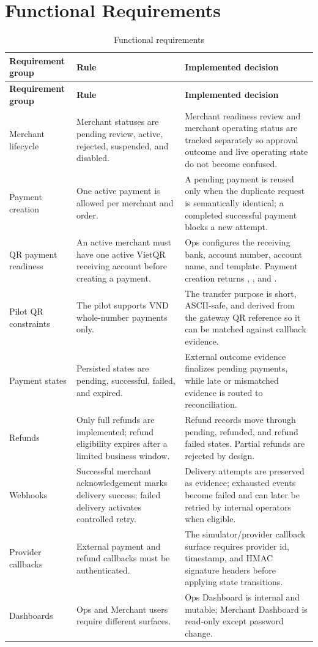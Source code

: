\section{Functional Requirements}

\begin{longtable}{L{0.24\textwidth}L{0.30\textwidth}L{0.36\textwidth}}
\caption{Functional requirements}\\
\toprule
\textbf{Requirement group} & \textbf{Rule} & \textbf{Implemented decision} \\
\midrule
\endfirsthead
\toprule
\textbf{Requirement group} & \textbf{Rule} & \textbf{Implemented decision} \\
\midrule
\endhead
Merchant lifecycle & Merchant statuses are pending review, active, rejected, suspended, and disabled. & Merchant readiness review and merchant operating status are tracked separately so approval outcome and live operating state do not become confused. \\
\bodyrowrule
Payment creation & One active payment is allowed per merchant and order. & A pending payment is reused only when the duplicate request is semantically identical; a completed successful payment blocks a new attempt. \\
\bodyrowrule
QR payment readiness & An active merchant must have one active VietQR receiving account before creating a payment. & Ops configures the receiving bank, account number, account name, and template. Payment creation returns , , and . \\
\bodyrowrule
Pilot QR constraints & The pilot supports VND whole-number payments only. & The transfer purpose is short, ASCII-safe, and derived from the gateway QR reference so it can be matched against callback evidence. \\
\bodyrowrule
Payment states & Persisted states are pending, successful, failed, and expired. & External outcome evidence finalizes pending payments, while late or mismatched evidence is routed to reconciliation. \\
\bodyrowrule
Refunds & Only full refunds are implemented; refund eligibility expires after a limited business window. & Refund records move through pending, refunded, and refund failed states. Partial refunds are rejected by design. \\
\bodyrowrule
Webhooks & Successful merchant acknowledgement marks delivery success; failed delivery activates controlled retry. & Delivery attempts are preserved as evidence; exhausted events become failed and can later be retried by internal operators when eligible. \\
\bodyrowrule
Provider callbacks & External payment and refund callbacks must be authenticated. & The simulator/provider callback surface requires provider id, timestamp, and HMAC signature headers before applying state transitions. \\
\bodyrowrule
Dashboards & Ops and Merchant users require different surfaces. & Ops Dashboard is internal and mutable; Merchant Dashboard is read-only except password change. \\
\bottomrule
\end{longtable}

